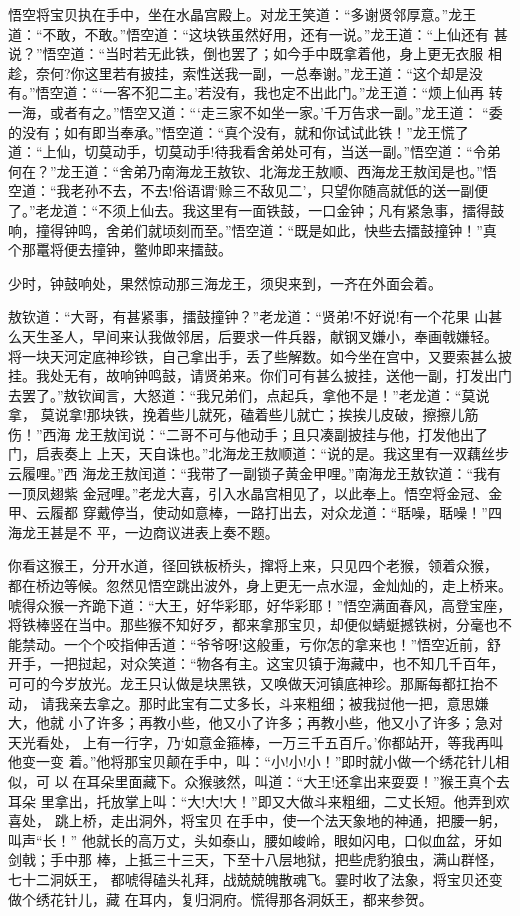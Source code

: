 悟空将宝贝执在手中，坐在水晶宫殿上。对龙王笑道：“多谢贤邻厚意。”龙王
道：“不敢，不敢。”悟空道：“这块铁虽然好用，还有一说。”龙王道：“上仙还有
甚说？”悟空道：“当时若无此铁，倒也罢了；如今手中既拿着他，身上更无衣服
相趁，奈何?你这里若有披挂，索性送我一副，一总奉谢。”龙王道：“这个却是没
有。”悟空道：“‘一客不犯二主。’若没有，我也定不出此门。”龙王道：“烦上仙再
转一海，或者有之。”悟空又道：“‘走三家不如坐一家。’千万告求一副。”龙王道：
“委的没有；如有即当奉承。”悟空道：“真个没有，就和你试试此铁！”龙王慌了
道：“上仙，切莫动手，切莫动手!待我看舍弟处可有，当送一副。”悟空道：“令弟
何在？”龙王道：“舍弟乃南海龙王敖钦、北海龙王敖顺、西海龙王敖闰是也。”悟
空道：“我老孙不去，不去!俗语谓‘赊三不敌见二’，只望你随高就低的送一副便
了。”老龙道：“不须上仙去。我这里有一面铁鼓，一口金钟；凡有紧急事，擂得鼓
响，撞得钟鸣，舍弟们就顷刻而至。”悟空道：“既是如此，快些去擂鼓撞钟！”真
个那鼍将便去撞钟，鳖帅即来擂鼓。

少时，钟鼓响处，果然惊动那三海龙王，须臾来到，一齐在外面会着。

敖钦道：“大哥，有甚紧事，擂鼓撞钟？”老龙道：“贤弟!不好说!有一个花果
山甚么天生圣人，早间来认我做邻居，后要求一件兵器，献钢叉嫌小，奉画戟嫌轻。
将一块天河定底神珍铁，自己拿出手，丢了些解数。如今坐在宫中，又要索甚么披
挂。我处无有，故响钟鸣鼓，请贤弟来。你们可有甚么披挂，送他一副，打发出门
去罢了。”敖钦闻言，大怒道：“我兄弟们，点起兵，拿他不是！”老龙道：“莫说拿，
莫说拿!那块铁，挽着些儿就死，磕着些儿就亡；挨挨儿皮破，擦擦儿筋伤！”西海
龙王敖闰说：“二哥不可与他动手；且只凑副披挂与他，打发他出了门，启表奏上
上天，天自诛也。”北海龙王敖顺道：“说的是。我这里有一双藕丝步云履哩。”西
海龙王敖闰道：“我带了一副锁子黄金甲哩。”南海龙王敖钦道：“我有一顶凤翅紫
金冠哩。”老龙大喜，引入水晶宫相见了，以此奉上。悟空将金冠、金甲、云履都
穿戴停当，使动如意棒，一路打出去，对众龙道：“聒噪，聒噪！”四海龙王甚是不
平，一边商议进表上奏不题。

你看这猴王，分开水道，径回铁板桥头，撺将上来，只见四个老猴，领着众猴，
都在桥边等候。忽然见悟空跳出波外，身上更无一点水湿，金灿灿的，走上桥来。
唬得众猴一齐跪下道：“大王，好华彩耶，好华彩耶！”悟空满面春风，高登宝座，
将铁棒竖在当中。那些猴不知好歹，都来拿那宝贝，却便似蜻蜓撼铁树，分毫也不
能禁动。一个个咬指伸舌道：“爷爷呀!这般重，亏你怎的拿来也！”悟空近前，舒
开手，一把挝起，对众笑道：“物各有主。这宝贝镇于海藏中，也不知几千百年，
可可的今岁放光。龙王只认做是块黑铁，又唤做天河镇底神珍。那厮每都扛抬不动，
请我亲去拿之。那时此宝有二丈多长，斗来粗细；被我挝他一把，意思嫌大，他就
小了许多；再教小些，他又小了许多；再教小些，他又小了许多；急对天光看处，
上有一行字，乃‘如意金箍棒，一万三千五百斤。’你都站开，等我再叫他变一变
着。”他将那宝贝颠在手中，叫：“小!小!小！”即时就小做一个绣花针儿相似，可
以在耳朵里面藏下。众猴骇然，叫道：“大王!还拿出来耍耍！”猴王真个去耳朵
里拿出，托放掌上叫：“大!大!大！”即又大做斗来粗细，二丈长短。他弄到欢喜处，
跳上桥，走出洞外，将宝贝在手中，使一个法天象地的神通，把腰一躬，叫声“长！”
他就长的高万丈，头如泰山，腰如峻岭，眼如闪电，口似血盆，牙如剑戟；手中那
棒，上抵三十三天，下至十八层地狱，把些虎豹狼虫，满山群怪，七十二洞妖王，
都唬得磕头礼拜，战兢兢魄散魂飞。霎时收了法象，将宝贝还变做个绣花针儿，藏
在耳内，复归洞府。慌得那各洞妖王，都来参贺。

